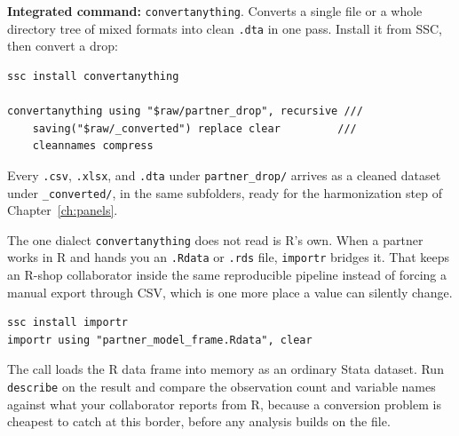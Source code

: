 \begin{kaobox}[frametitle=Package Integration: \texttt{convertanything}]
\textbf{Integrated command:} \texttt{convertanything}. Converts a single file or a whole directory tree of mixed formats into clean \texttt{.dta} in one pass. Install it from SSC, then convert a drop:
\par
{\footnotesize
\begin{verbatim}
ssc install convertanything

convertanything using "$raw/partner_drop", recursive ///
    saving("$raw/_converted") replace clear         ///
    cleannames compress
\end{verbatim}
}
Every \texttt{.csv}, \texttt{.xlsx}, and \texttt{.dta} under \texttt{partner\_drop/} arrives as a cleaned dataset under \texttt{\_converted/}, in the same subfolders, ready for the harmonization step of Chapter~\ref{ch:panels}.
\end{kaobox}

The one dialect \texttt{convertanything} does not read is R's own. When a partner works in R and hands you an \texttt{.Rdata} or \texttt{.rds} file, \texttt{importr} bridges it. That keeps an R-shop collaborator inside the same reproducible pipeline instead of forcing a manual export through CSV, which is one more place a value can silently change.
\par
{\footnotesize
\begin{verbatim}
ssc install importr
importr using "partner_model_frame.Rdata", clear
\end{verbatim}
}
The call loads the R data frame into memory as an ordinary Stata dataset. Run \texttt{describe} on the result and compare the observation count and variable names against what your collaborator reports from R, because a conversion problem is cheapest to catch at this border, before any analysis builds on the file.

